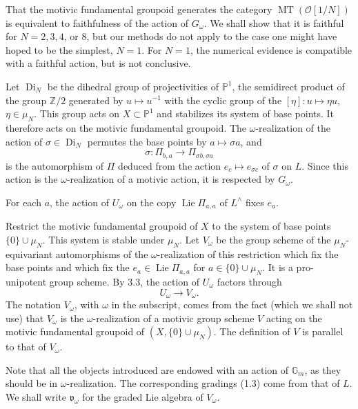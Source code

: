 \documentclass[10pt,a4paper]{article}
\newcommand{\Gm}{\mathbb G_m}
\newcommand{\muN}{\mu_N}
\newcommand{\Z}{\mathbb Z}
\newcommand{\Pone}{\mathbb P^1}
\newcommand{\Lie}{\operatorname{Lie}}
\newcommand{\MT}{\operatorname{MT}}
\newcommand{\OO}{\mathcal O}
\newcommand{\vomega}{\mathfrak v_\omega}
\newcommand{\Lhat}{L^{\wedge}}
\theoremstyle{deligne}
\newcommand{\heading}[1]{\vspace{0.65em}\noindent{\bfseries #1}\quad}
\begin{document}
That the motivic fundamental groupoid generates the category \(\MT(\OO[1/N])\) is equivalent to faithfulness of the action of \(G_\omega\). We shall show that it is faithful for \(N=2,3,4\), or \(8\), but our methods do not apply to the case one might have hoped to be the simplest, \(N=1\). For \(N=1\), the numerical evidence is compatible with a faithful action, but is not conclusive.

\heading{3.3.} Let \(\operatorname{Di}_N\) be the dihedral group of projectivities of \(\Pone\), the semidirect product of the group \(\Z/2\) generated by \(u\mapsto u^{-1}\) with the cyclic group of the \([\eta]:u\mapsto\eta u\), \(\eta\in\muN\). This group acts on \(X\subset\Pone\) and stabilizes its system of base points. It therefore acts on the motivic fundamental groupoid. The \(\omega\)-realization of the action of \(\sigma\in\operatorname{Di}_N\) permutes the base points by \(a\mapsto\sigma a\), and
\[
\sigma:\Pi_{b,a}\longrightarrow \Pi_{\sigma b,\sigma a}
\]
is the automorphism of \(\Pi\) deduced from the action \(e_c\mapsto e_{\sigma c}\) of \(\sigma\) on \(L\). Since this action is the \(\omega\)-realization of a motivic action, it is respected by \(G_\omega\).

For each \(a\), the action of \(U_\omega\) on the copy \(\Lie\Pi_{a,a}\) of \(\Lhat\) fixes \(e_a\).

\heading{3.4.} Restrict the motivic fundamental groupoid of \(X\) to the system of base points \(\{0\}\cup\muN\). This system is stable under \(\muN\). Let \(V_\omega\) be the group scheme of the \(\muN\)-equivariant automorphisms of the \(\omega\)-realization of this restriction which fix the base points and which fix the \(e_a\in\Lie\Pi_{a,a}\) for \(a\in\{0\}\cup\muN\). It is a pro-unipotent group scheme. By 3.3, the action of \(U_\omega\) factors through
\[
\tag{3.4.1}
U_\omega\longrightarrow V_\omega.
\]
The notation \(V_\omega\), with \(\omega\) in the subscript, comes from the fact (which we shall not use) that \(V_\omega\) is the \(\omega\)-realization of a motivic group scheme \(V\) acting on the motivic fundamental groupoid of \((X,\{0\}\cup\muN)\). The definition of \(V\) is parallel to that of \(V_\omega\).

Note that all the objects introduced are endowed with an action of \(\Gm\), as they should be in \(\omega\)-realization. The corresponding gradings (1.3) come from that of \(L\). We shall write \(\vomega\) for the graded Lie algebra of \(V_\omega\).
\end{document}
